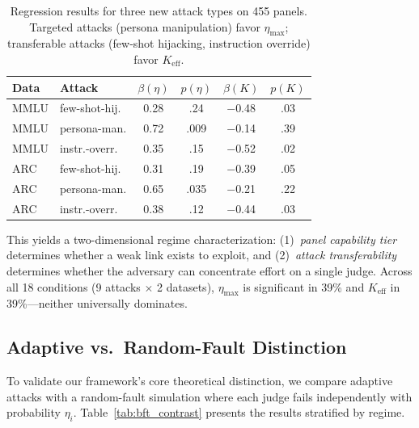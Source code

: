 \documentclass[11pt]{article}
\begin{document}
\begin{table}[t]
\centering
\small
\begin{tabular}{llcccc}
\toprule
\textbf{Data} & \textbf{Attack} & $\beta(\eta)$ & $p(\eta)$ & $\beta(K)$ & $p(K)$ \\
\midrule
MMLU & few-shot-hij. & 0.28 & .24 & $-$0.48 & .03 \\
MMLU & persona-man. & 0.72 & .009 & $-$0.14 & .39 \\
MMLU & instr.-overr. & 0.35 & .15 & $-$0.52 & .02 \\
ARC & few-shot-hij. & 0.31 & .19 & $-$0.39 & .05 \\
ARC & persona-man. & 0.65 & .035 & $-$0.21 & .22 \\
ARC & instr.-overr. & 0.38 & .12 & $-$0.44 & .03 \\
\bottomrule
\end{tabular}
\caption{Regression results for three new attack types on 455 panels. Targeted attacks (persona manipulation) favor $\eta_{\max}$; transferable attacks (few-shot hijacking, instruction override) favor $K_{\text{eff}}$.}
\label{tab:new_attacks}
\end{table}

This yields a two-dimensional regime characterization: (1)~\emph{panel capability tier} determines whether a weak link exists to exploit, and (2)~\emph{attack transferability} determines whether the adversary can concentrate effort on a single judge.
Across all 18 conditions (9 attacks $\times$ 2 datasets), $\eta_{\max}$ is significant in 39\% and $K_{\text{eff}}$ in 39\%---neither universally dominates.

\subsection{Adaptive vs.\ Random-Fault Distinction}
\label{sec:bft}

To validate our framework's core theoretical distinction, we compare adaptive attacks with a random-fault simulation where each judge fails independently with probability $\eta_i$.
Table~\ref{tab:bft_contrast} presents the results stratified by regime.
\end{document}
